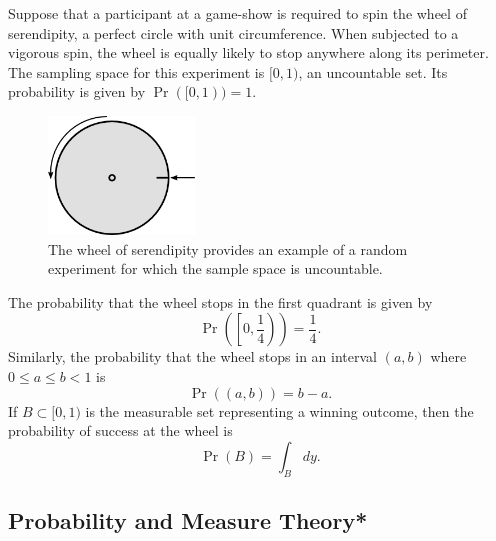 \begin{example}
Suppose that a participant at a game-show is required to spin the wheel of serendipity, a perfect circle with unit circumference.
When subjected to a vigorous spin, the wheel is equally likely to stop anywhere along its perimeter.
The sampling space for this experiment is $[0, 1)$, an uncountable set.
Its probability is given by $\Pr ([0, 1)) = 1$.

\begin{figure}[htp!]
\begin{center}
\includegraphics[height=3.15cm]{Figures/2Chapter/wheel}
\caption{The wheel of serendipity provides an example of a random experiment for which the sample space is uncountable.}
\end{center}
\end{figure}

The probability that the wheel stops in the first quadrant is given by
\begin{equation*}
\Pr \left( \left[ 0, \frac{1}{4} \right) \right) = \frac{1}{4}.
\end{equation*}
Similarly, the probability that the wheel stops in an interval $(a, b)$ where $0 \leq a \leq b < 1$ is
\begin{equation*}
\Pr ((a,b)) = b - a.
\end{equation*}
If $B \subset [0, 1)$ is the measurable set representing a winning outcome, then the probability of success at the wheel is
\begin{equation*}
\Pr(B) = \int_B dy .
\end{equation*}
\end{example}


\subsection{Probability and Measure Theory*}

